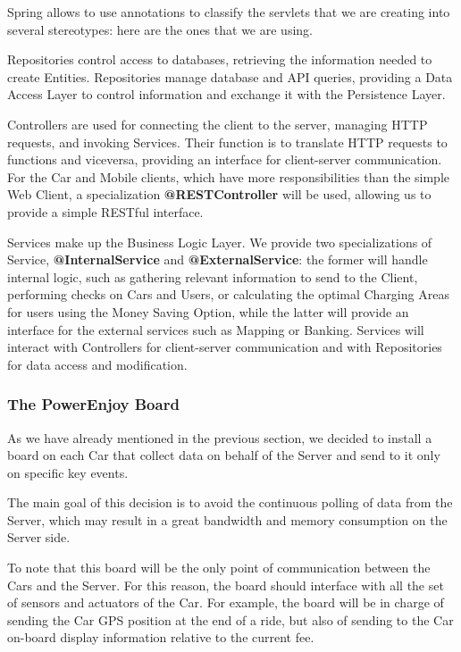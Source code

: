 \documentclass[12pt]{article}
\begin{document}
Spring allows to use annotations to classify the servlets that we are creating into several stereotypes: here are the ones that we are using.
\begin{description}[leftmargin=!,labelwidth=\widthof{\bfseries @Repository}]
	\item[@Repository] Repositories control access to databases, retrieving the information needed to create Entities. Repositories manage database and API queries, providing a Data Access Layer to control information and exchange it with the Persistence Layer.
	\item[@Controller] Controllers are used for connecting the client to the server, managing HTTP requests, and invoking Services. Their function is to translate HTTP requests to functions and viceversa, providing an interface for client-server communication. For the Car and Mobile clients, which have more responsibilities than the simple Web Client, a specialization \textbf{@RESTController} will be used, allowing us to provide a simple RESTful interface.
	\item[@Service] Services make up the Business Logic Layer. We provide two specializations of Service, \textbf{@InternalService} and \textbf{@ExternalService}: the former will handle internal logic, such as gathering relevant information to send to the Client, performing checks on Cars and Users, or calculating the optimal Charging Areas for users using the Money Saving Option, while the latter will provide an interface for the external services such as Mapping or Banking. Services will interact with Controllers for client-server communication and with Repositories for data access and modification.
\end{description}

\subsubsection{The PowerEnjoy Board}
As we have already mentioned in the previous section, we decided to install a board on each Car that collect data on behalf of the Server and send to it only on specific key events. 

The main goal of this decision is to avoid the continuous polling of data from the Server, which may result in a great bandwidth and memory consumption on the Server side.

To note that this board will be the only point of communication between the Cars and the Server. For this reason, the board should interface with all the set of sensors and actuators of the Car. For example, the board will be in charge of sending the Car GPS position at the end of a ride, but also of sending to the Car on-board display information relative to the current fee.
\end{document}
